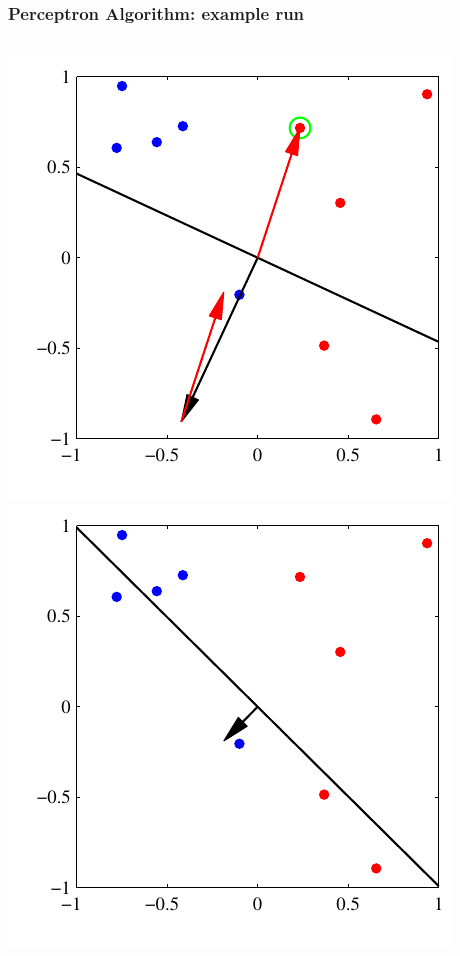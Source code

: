 \documentclass[ignorenonframetext,plain]{beamer}
\begin{document}
\begin{frame}\frametitle{Perceptron Algorithm: example run}
\begin{columns}
\includegraphics[height=.4\textheight]{images/bishop-fig-4-7a.pdf}
\includegraphics[height=.4\textheight]{images/bishop-fig-4-7b.pdf}\\ 

\end{columns}
\end{frame}
\end{document}
